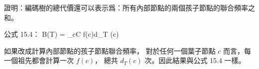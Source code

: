 \startEXERCISE
證明：編碼樹的總代價還可以表示爲：所有內部節點的兩個孩子節點的聯合頻率之和。
\stopEXERCISE

\startANSWER
公式 15.4：
\startformula
B(T) = \sum_{c\in C} f(c)d_{T} (c)
\stopformula

如果改成計算內部節點的孩子節點聯合頻率，
對於任何一個葉子節點 $c$ 而言，每一個祖先都會計算一次 $f(c)$，
總共 $d_{T} (c)$ 次。因此結果與公式 15.4 一樣。
\stopANSWER
